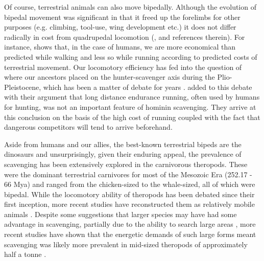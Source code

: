 \documentclass[a4paper,12pt]{article}
\begin{document}
Of course, terrestrial animals can also move bipedally. 
Although the evolution of bipedal  movement was significant in that it freed up the forelimbs for other purposes (e.g. climbing, tool-use, wing development etc.) it does not differ radically in cost from quadrupedal locomotion (\cite{williams1999evolution}, and references therein). 
For instance, \cite{alexander2004bipedal} shows  that, in the case of humans, we are more economical than predicted while walking and less so while running according to predicted costs of terrestrial movement.
Our locomotory efficiency has fed into the question of where our ancestors placed on the hunter-scavenger axis during the Plio-Pleistocene, which has been a matter of debate for years \citep{dominguez2002hunting}.
\cite{ruxton2013endurance} added to this debate with their argument that long distance endurance running, often used by humans for hunting, was not an important feature of hominin scavenging.
They arrive at this conclusion on the basis of the high cost of running coupled with the fact that dangerous competitors will tend to arrive beforehand. 



Aside from humans and our allies, the best-known terrestrial bipeds are the dinosaurs and unsurprisingly, given their enduring appeal, the prevalence of scavenging has been extensively explored in the carnivorous theropods.
These were the dominant terrestrial carnivores for most of the Mesozoic Era (252.17 - 66 Mya) and ranged from the chicken-sized to the whale-sized, all of which were bipedal.
While the locomotory ability of theropods has been debated since their first inception, more recent studies have reconstructed them as relatively mobile animals \citep{pontzer2009biomechanics}. 
Despite some suggestions that larger species may have had some advantage in scavenging, partially due to the ability to search large areas \citep{ruxton2003could}, more recent studies have shown that the energetic demands of such large forms meant scavenging was likely more prevalent in mid-sized theropods of approximately half a tonne \citep{carbone2011intra,kane2016body}.
\end{document}
